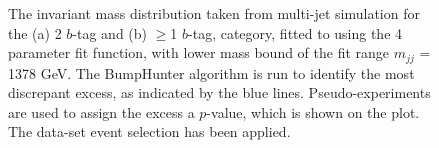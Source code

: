 \begin{figure}[!ht]
  \begin{center}
    \captionsetup[subfigure]{aboveskip=0pt,justification=centering}
  \end{center}
  \caption{ The invariant mass distribution taken from multi-jet simulation for the (a) 2 $b$-tag and (b) $\geq$1 $b$-tag,
    category, fitted to using the 4 parameter fit function, with lower mass bound of the fit range $m_{jj}$ = 1378 GeV.
    The BumpHunter algorithm is run to identify the most discrepant excess, as indicated by the blue lines.
    Pseudo-experiments are used to assign the excess a \mbox{$p$-value}, which is shown on the plot. 
    The \summer{} data-set event selection has been applied.}
  \label{fig:Short_4para_1378_figure1}
\end{figure}


